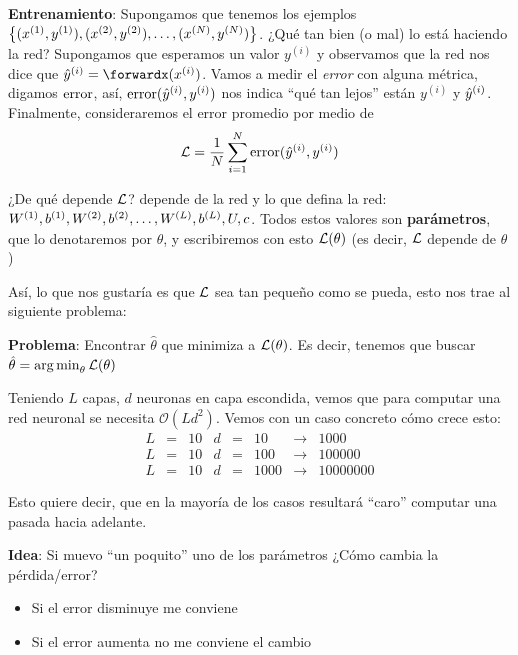 \textbf{Entrenamiento}: Supongamos que tenemos los ejemplos $\conj{(x^{(1)}, y^{(1)}), (x^{(2)}, y^{(2)}), \ldots, (x^{(N)}, y^{(N)})}$. ¿Qué tan bien (o mal) lo está haciendo la red? Supongamos que esperamos un valor $y^{(i)}$ y observamos que la red nos dice que $\hy^{(i)} = \forwardx(x^{(i)})$. Vamos a medir el \textit{error} con alguna métrica, digamos $\error$, así, $\error(\hy^{(i)}, y^{(i)})$ nos indica ``qué tan lejos'' están $y^{(i)}$ y $\hy^{(i)}$. Finalmente, consideraremos el error promedio por medio de
\begin{equation*}
    \L = \frac{1}{N} \sum_{i=1}^{N} \error(\hy^{(i)}, y^{(i)})
\end{equation*}

¿De qué depende $\L$? depende de la red y lo que defina la red: $W\entr[1], b\entr[1], W\entr[2], b\entr[2], \ldots, W\entr[L], b\entr[L], U, c$. Todos estos valores son \textbf{parámetros}, que lo denotaremos por $\theta$, y escribiremos con esto $\L(\theta)$ (es decir, $\L$ depende de $\theta$)

Así, lo que nos gustaría es que $\L$ sea tan pequeño como se pueda, esto nos trae al siguiente problema:

\textbf{Problema}: Encontrar $\hat{\theta}$
que minimiza a $\L(\theta)$. Es decir, tenemos que buscar
$\hat{\theta} 
= \argmin_{\theta} \L(\theta)$

Teniendo $L$ capas, $d$ neuronas en capa escondida, vemos que para computar una red neuronal se necesita $\mathcal{O}(Ld^{2})$. Vemos con un caso concreto cómo crece esto:
\begin{equation*}
    \begin{array}{lcrlcrcl}
    L &=& 10 & d&=&10 &\rightarrow& 1000\\
    L &=& 10 & d&=&100 &\rightarrow& 100000\\
    L &=& 10 & d&=&1000 &\rightarrow& 10000000
    \end{array}
\end{equation*}

Esto quiere decir, que en la mayoría de los casos resultará ``caro'' computar una pasada hacia adelante.

\textbf{Idea}: Si muevo ``un poquito'' uno de los parámetros ¿Cómo cambia la pérdida/error?
\begin{itemize}
    \item Si el error disminuye me conviene
    \item Si el error aumenta no me conviene el cambio
\end{itemize}


